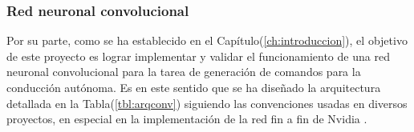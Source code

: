         \subsubsection{Red neuronal convolucional}

        Por su parte, como se ha establecido en el Capítulo(\ref{ch:introduccion}), el objetivo de este proyecto es lograr 
        implementar y validar el funcionamiento de una red neuronal convolucional para la tarea de generación de comandos 
        para la conducción autónoma. Es en este sentido que se ha diseñado la arquitectura detallada en la Tabla(\ref{tbl:arqconv})
        siguiendo las convenciones usadas en diversos proyectos, en especial en la implementación de la red fin a fin 
        de Nvidia \cite{bojarski2016end}.


